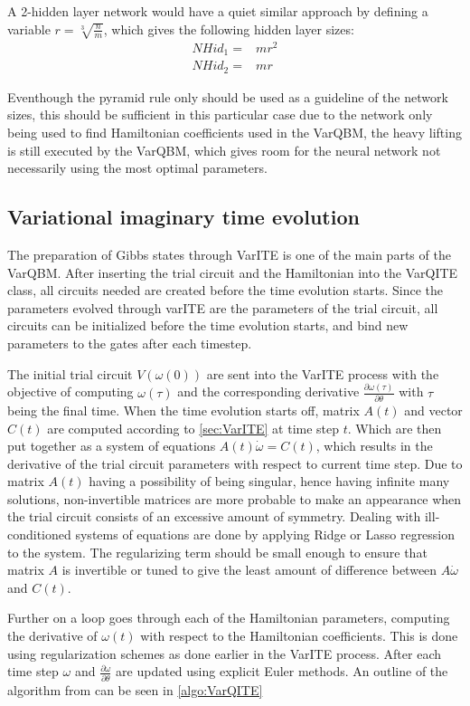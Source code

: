 \documentclass[../main.tex]{subfiles}
\begin{document}
A 2-hidden layer network would have a quiet similar approach by defining a variable $r=\sqrt[3]{\frac{n}{m}}$, which gives the following hidden layer sizes:
\begin{align*}
    NHid_1=&mr^2\\
    NHid_2=&mr
\end{align*}

Eventhough the pyramid rule only should be used as a guideline of the network sizes, this should be sufficient in this particular case due to the network only being used to find Hamiltonian coefficients used in the VarQBM, the heavy lifting is still executed by the VarQBM, which gives room for the neural network not necessarily using the most optimal parameters. 

\subsection{Variational imaginary time evolution}
The preparation of Gibbs states through VarITE is one of the main parts of the VarQBM. After inserting the trial circuit and the Hamiltonian into the VarQITE class, all circuits needed are created before the time evolution starts. Since the parameters evolved through varITE are the parameters of the trial circuit, all circuits can be initialized before the time evolution starts, and bind new parameters to the gates after each timestep.

The initial trial circuit $V(\omega(0))$ are sent into the VarITE process with the objective of computing $\omega(\tau)$ and the corresponding derivative $\frac{\partial \omega(\tau)}{\partial \theta}$ with $\tau$ being the final time. When the time evolution starts off, matrix $A(t)$ and vector $C(t)$ are computed according to \autoref{sec:VarITE} at time step $t$. Which are then put together as a system of equations $A(t)\dot{\omega}=C(t)$, which results in the derivative of the trial circuit parameters with respect to current time step. Due to matrix $A(t)$ having a possibility of being singular, hence having infinite many solutions, non-invertible matrices are more probable to make an appearance when the trial circuit consists of an excessive amount of symmetry. Dealing with ill-conditioned systems of equations are done by applying Ridge or Lasso regression to the system. The regularizing term should be small enough to ensure that matrix $A$ is invertible or tuned to give the least amount of difference between $A\dot{\omega}$ and $C(t)$.

Further on a loop goes through each of the Hamiltonian parameters, computing the derivative of $\omega(t)$ with respect to the Hamiltonian coefficients. This is done using regularization schemes as done earlier in the VarITE process. After each time step $\omega$ and $\frac{\partial\omega}{\partial \theta}$ are updated using explicit Euler methods. An outline of the algorithm from \cite{VQB:litteraturelist} can be seen in \autoref{algo:VarQITE}
\end{document}
